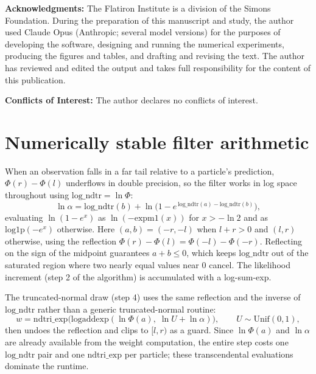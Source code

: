 \documentclass[11pt]{article}
\begin{document}
\medskip
\noindent\textbf{Acknowledgments:} The Flatiron Institute is a division of the Simons Foundation. During the preparation of this manuscript and study, the author used Claude Opus (Anthropic; several model versions) for the purposes of developing the software, designing and running the numerical experiments, producing the figures and tables, and drafting and revising the text. The author has reviewed and edited the output and takes full responsibility for the content of this publication.

\medskip
\noindent\textbf{Conflicts of Interest:} The author declares no conflicts of interest.

\appendix

\renewcommand{\thetable}{\thesection\arabic{table}}

\section{Numerically stable filter arithmetic}\label{numerically-stable-filter-arithmetic}

When an observation falls in a far tail relative to a particle's prediction, \(\Phi(r) - \Phi(l)\) underflows in double precision, so the filter works in log space throughout using \(\mathrm{log\_ndtr} = \ln\Phi\):
\[\ln\alpha = \mathrm{log\_ndtr}(b) + \ln\!\big(1 - e^{\,\mathrm{log\_ndtr}(a) - \mathrm{log\_ndtr}(b)}\big),\]
evaluating \(\ln(1-e^x)\) as \(\ln(-\mathrm{expm1}(x))\) for \(x > -\ln 2\) and as \(\mathrm{log1p}(-e^x)\) otherwise. Here \((a,b) = (-r,-l)\) when \(l + r > 0\) and \((l,r)\) otherwise, using the reflection \(\Phi(r) - \Phi(l) = \Phi(-l) - \Phi(-r)\). Reflecting on the sign of the midpoint guarantees \(a + b \le 0\), which keeps \(\mathrm{log\_ndtr}\) out of the saturated region where two nearly equal values near \(0\) cancel. The likelihood increment (step 2 of the algorithm) is accumulated with a log-sum-exp.

The truncated-normal draw (step 4) uses the same reflection and the inverse of \(\mathrm{log\_ndtr}\) rather than a generic truncated-normal routine:
\[w = \mathrm{ndtri\_exp}\big(\mathrm{logaddexp}(\ln\Phi(a),\; \ln U + \ln\alpha)\big), \qquad U \sim \mathrm{Unif}(0,1),\]
then undoes the reflection and clips to \([l,r)\) as a guard. Since \(\ln\Phi(a)\) and \(\ln\alpha\) are already available from the weight computation, the entire step costs one \(\mathrm{log\_ndtr}\) pair and one \(\mathrm{ndtri\_exp}\) per particle; these transcendental evaluations dominate the runtime.
\end{document}

